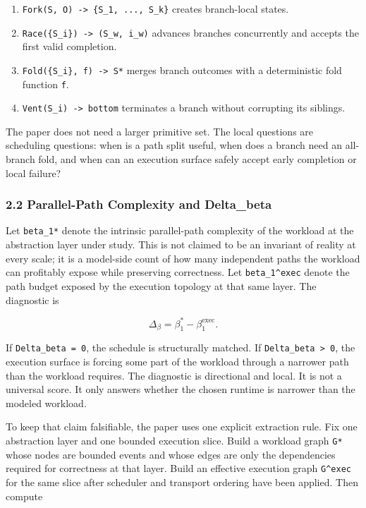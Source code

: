 \documentclass[
  11pt,
]{article}
\providecommand{\tightlist}{%
  \setlength{\itemsep}{0pt}\setlength{\parskip}{0pt}}
\begin{document}
\begin{enumerate}
\def\labelenumi{\arabic{enumi}.}
\tightlist
\item
  \texttt{Fork(S,\ O)\ -\textgreater{}\ \{S\_1,\ ...,\ S\_k\}} creates
  branch-local states.
\item
  \texttt{Race(\{S\_i\})\ -\textgreater{}\ (S\_w,\ i\_w)} advances
  branches concurrently and accepts the first valid completion.
\item
  \texttt{Fold(\{S\_i\},\ f)\ -\textgreater{}\ S*} merges branch
  outcomes with a deterministic fold function \texttt{f}.
\item
  \texttt{Vent(S\_i)\ -\textgreater{}\ bottom} terminates a branch
  without corrupting its siblings.
\end{enumerate}

The paper does not need a larger primitive set. The local questions are
scheduling questions: when is a path split useful, when does a branch
need an all-branch fold, and when can an execution surface safely accept
early completion or local failure?

\subsubsection{2.2 Parallel-Path Complexity and
Delta\_beta}\label{parallel-path-complexity-and-delta_beta}

Let \texttt{beta\_1*} denote the intrinsic parallel-path complexity of
the workload at the abstraction layer under study. This is not claimed
to be an invariant of reality at every scale; it is a model-side count
of how many independent paths the workload can profitably expose while
preserving correctness. Let \texttt{beta\_1\^{}exec} denote the path
budget exposed by the execution topology at that same layer. The
diagnostic is

\[
\Delta_\beta = \beta_1^* - \beta_1^{\mathrm{exec}}.
\]

If \texttt{Delta\_beta\ =\ 0}, the schedule is structurally matched. If
\texttt{Delta\_beta\ \textgreater{}\ 0}, the execution surface is
forcing some part of the workload through a narrower path than the
workload requires. The diagnostic is directional and local. It is not a
universal score. It only answers whether the chosen runtime is narrower
than the modeled workload.

To keep that claim falsifiable, the paper uses one explicit extraction
rule. Fix one abstraction layer and one bounded execution slice. Build a
workload graph \texttt{G*} whose nodes are bounded events and whose
edges are only the dependencies required for correctness at that layer.
Build an effective execution graph \texttt{G\^{}exec} for the same slice
after scheduler and transport ordering have been applied. Then compute
\end{document}
